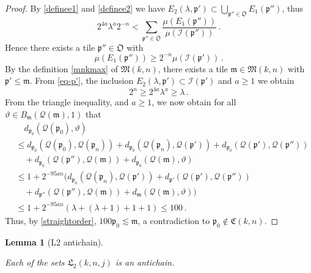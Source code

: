 \documentclass[10pt,a4paper]{article}
\theoremstyle{plain}
\newtheorem{lemma}[theorem]{Lemma}
\theoremstyle{definition}
\numberwithin{equation}{subsection}
\newcommand{\fp}{{\mathfrak p}}
\newcommand{\fL}{{\mathfrak L}}
\newcommand{\fC}{{\mathfrak C}}
\newcommand{\scI}{{\mathcal{I}}} %
\newcommand{\mfa}{{\vartheta}}
\newcommand{\fcc}{{\mathcal{Q}}}
\newcommand{\lean}[1]{}
\newcommand{\uses}[1]{}
\newcommand{\leanok}{}
\begin{document}
\begin{proof}
    By \eqref{definee1} and \eqref{definee2} we have $E_2(\lambda, \fp') \subset \bigcup_{\fp'' \in \mathfrak{O}} E_1(\fp'')$, thus
    $$
        2^{4a}\lambda^a 2^{-n} < \sum_{\fp'' \in \mathfrak{O}} \frac{\mu(E_1(\fp''))}{\mu(\scI(\fp''))}\,.
    $$
    Hence there exists a tile $\fp'' \in \mathfrak{O}$ with
    \begin{equation*}
        \mu(E_1(\fp'')) \ge 2^{-n} \mu(\scI(\fp'))\,.
    \end{equation*}
    By the definition \eqref{mnkmax} of $\mathfrak{M}(k,n)$, there exists a tile $\mathfrak{m} \in \mathfrak{M}(k,n)$ with $\fp' \leq \mathfrak{m}$. From \eqref{eq-p'}, the inclusion $E_2(\lambda, \fp') \subset \scI(\fp')$ and $a\ge 1$ we obtain
    $$
        2^n \geq 2^{4a} \lambda^{a} \geq \lambda\,.
    $$
    From the triangle inequality,  and $a \ge 1$, we now obtain for all $\mfa \in B_{\mathfrak{m}}(\fcc(\mathfrak{m}), 1)$ that
    \begin{align*}
        &\quad d_{\fp_0}(\fcc(\fp_0), \mfa)\\
        &\leq d_{\fp_0}(\fcc(\fp_0), \fcc(\fp_{n})) + d_{\fp_0}(\fcc(\fp_{n}), \fcc(\fp')) + d_{\fp_0}(\fcc(\fp'), \fcc(\fp''))\\
        &\quad+ d_{\fp_0}(\fcc(\fp''), \fcc(\mathfrak{m})) +
        d_{\fp_0}(\fcc(\mathfrak{m}), \mfa)\\
        &\leq 1 + 2^{-95an} (d_{\fp_{n}}(\fcc(\fp_n), \fcc(\fp')) + d_{\fp'}(\fcc(\fp'), \fcc(\fp''))\\
        &\quad+ d_{\fp''}(\fcc(\fp''), \fcc(\mathfrak{m})) +
        d_{\mathfrak{m}}(\fcc(\mathfrak{m}), \mfa))\\
        &\leq 1 + 2^{-95an}(\lambda + (\lambda + 1) + 1 + 1) \leq 100\,.
    \end{align*}
    Thus, by \eqref{straightorder}, $100\fp_0 \lesssim \mathfrak{m}$, a contradiction to $\fp_0 \notin \fC(k,n)$.
\end{proof}

\begin{lemma}[L2 antichain]
\label{L2-antichain}
\uses{monotone-cube-metrics}
\leanok
\lean{antichain_L2}
    Each of the sets $\fL_2(k,n,j)$ is an antichain.
\end{lemma}
\end{document}
